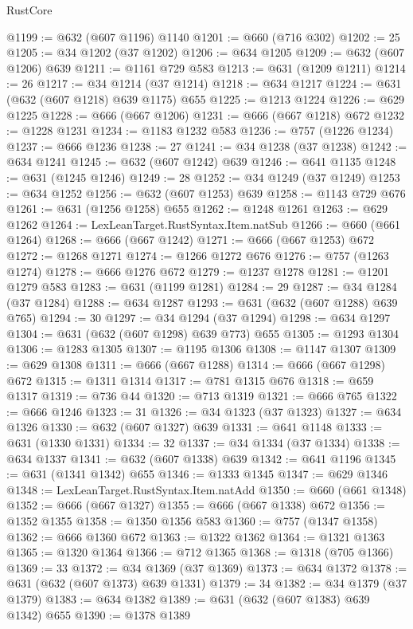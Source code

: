 \begin{lexlean}{RustCore}
\begin{coremodule}
@1199 := @632 (@607 @1196) @1140
@1201 := @660 (@716 @302)
@1202 := 25
@1205 := @34 @1202 (@37 @1202)
@1206 := @634 @1205
@1209 := @632 (@607 @1206) @639
@1211 := @1161 @729 @583
@1213 := @631 (@1209 @1211)
@1214 := 26
@1217 := @34 @1214 (@37 @1214)
@1218 := @634 @1217
@1224 := @631 (@632 (@607 @1218) @639 @1175) @655
@1225 := @1213 @1224
@1226 := @629 @1225
@1228 := @666 (@667 @1206)
@1231 := @666 (@667 @1218) @672
@1232 := @1228 @1231
@1234 := @1183 @1232 @583
@1236 := @757 (@1226 @1234)
@1237 := @666 @1236
@1238 := 27
@1241 := @34 @1238 (@37 @1238)
@1242 := @634 @1241
@1245 := @632 (@607 @1242) @639
@1246 := @641 @1135
@1248 := @631 (@1245 @1246)
@1249 := 28
@1252 := @34 @1249 (@37 @1249)
@1253 := @634 @1252
@1256 := @632 (@607 @1253) @639
@1258 := @1143 @729 @676
@1261 := @631 (@1256 @1258) @655
@1262 := @1248 @1261
@1263 := @629 @1262
@1264 := LexLeanTarget.RustSyntax.Item.natSub
@1266 := @660 (@661 @1264)
@1268 := @666 (@667 @1242)
@1271 := @666 (@667 @1253) @672
@1272 := @1268 @1271
@1274 := @1266 @1272 @676
@1276 := @757 (@1263 @1274)
@1278 := @666 @1276 @672
@1279 := @1237 @1278
@1281 := @1201 @1279 @583
@1283 := @631 (@1199 @1281)
@1284 := 29
@1287 := @34 @1284 (@37 @1284)
@1288 := @634 @1287
@1293 := @631 (@632 (@607 @1288) @639 @765)
@1294 := 30
@1297 := @34 @1294 (@37 @1294)
@1298 := @634 @1297
@1304 := @631 (@632 (@607 @1298) @639 @773) @655
@1305 := @1293 @1304
@1306 := @1283 @1305
@1307 := @1195 @1306
@1308 := @1147 @1307
@1309 := @629 @1308
@1311 := @666 (@667 @1288)
@1314 := @666 (@667 @1298) @672
@1315 := @1311 @1314
@1317 := @781 @1315 @676
@1318 := @659 @1317
@1319 := @736 @44
@1320 := @713 @1319
@1321 := @666 @765
@1322 := @666 @1246
@1323 := 31
@1326 := @34 @1323 (@37 @1323)
@1327 := @634 @1326
@1330 := @632 (@607 @1327) @639
@1331 := @641 @1148
@1333 := @631 (@1330 @1331)
@1334 := 32
@1337 := @34 @1334 (@37 @1334)
@1338 := @634 @1337
@1341 := @632 (@607 @1338) @639
@1342 := @641 @1196
@1345 := @631 (@1341 @1342) @655
@1346 := @1333 @1345
@1347 := @629 @1346
@1348 := LexLeanTarget.RustSyntax.Item.natAdd
@1350 := @660 (@661 @1348)
@1352 := @666 (@667 @1327)
@1355 := @666 (@667 @1338) @672
@1356 := @1352 @1355
@1358 := @1350 @1356 @583
@1360 := @757 (@1347 @1358)
@1362 := @666 @1360 @672
@1363 := @1322 @1362
@1364 := @1321 @1363
@1365 := @1320 @1364
@1366 := @712 @1365
@1368 := @1318 (@705 @1366)
@1369 := 33
@1372 := @34 @1369 (@37 @1369)
@1373 := @634 @1372
@1378 := @631 (@632 (@607 @1373) @639 @1331)
@1379 := 34
@1382 := @34 @1379 (@37 @1379)
@1383 := @634 @1382
@1389 := @631 (@632 (@607 @1383) @639 @1342) @655
@1390 := @1378 @1389

\end{coremodule}
\end{lexlean}
